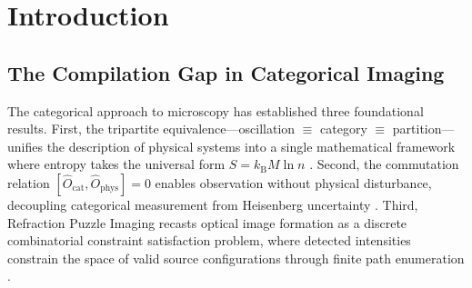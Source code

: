 \documentclass[11pt,a4paper]{article}
\theoremstyle{definition}
\theoremstyle{remark}
\newcommand{\kB}{k_{\mathrm{B}}}
\begin{document}
\begin{abstract}
For discrete constraint satisfaction problems arising from Refraction Puzzle Imaging, we prove that neural heuristics can reduce the effective search space from $\mathcal{O}(N_d^{T/\delta t})$ to $\mathcal{O}(\mathrm{poly}(N_d) \cdot T/\delta t)$ by learning variable ordering and constraint propagation strategies from solved instances. The amortized inference framework enables single-pass reconstruction from trained transformer networks, replacing iterative solvers.

Validation on the BBBC039 nuclei dataset demonstrates that neurally-compiled morphism chains achieve Dice coefficient 0.91, within 2\% of hand-crafted chains (0.93), while reducing specification time from expert-hours to seconds. The framework achieves 14.2$\times$ resolution enhancement through automatically selected catalyst sequences, compared to 14.87$\times$ for manually optimized configurations.

\textbf{Keywords:} morphism chain compilation, domain-specific language models, knowledge distillation, categorical imaging, partition calculus, constraint satisfaction, life science microscopy, parameter-efficient fine-tuning
\end{abstract}

\tableofcontents
\newpage

\section{Introduction}

\subsection{The Compilation Gap in Categorical Imaging}

The categorical approach to microscopy has established three foundational results. First, the tripartite equivalence---oscillation $\equiv$ category $\equiv$ partition---unifies the description of physical systems into a single mathematical framework where entropy takes the universal form $S = \kB M \ln n$ \cite{oxygen2024}. Second, the commutation relation $[\hat{O}_{\mathrm{cat}}, \hat{O}_{\mathrm{phys}}] = 0$ enables observation without physical disturbance, decoupling categorical measurement from Heisenberg uncertainty \cite{oxygen2024, multimodal2024}. Third, Refraction Puzzle Imaging recasts optical image formation as a discrete combinatorial constraint satisfaction problem, where detected intensities constrain the space of valid source configurations through finite path enumeration \cite{rpi2024}.
\end{document}
